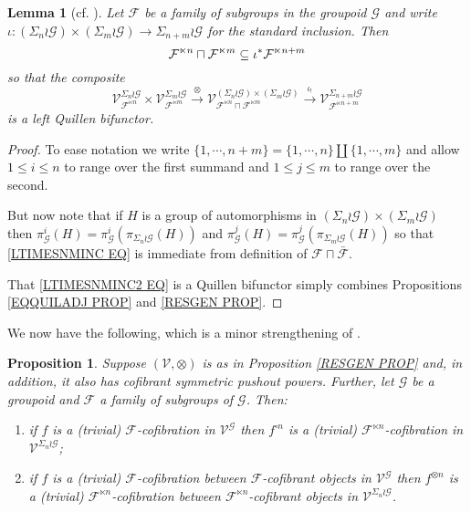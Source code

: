 \documentclass[a4paper,10pt
,draft
]{article}%
\numberwithin{equation}{section}
\numberwithin{figure}{section}
\newtheorem{lemma}[equation]{Lemma}%
\newtheorem{proposition}[equation]{Proposition}%
\theoremstyle{definition} %
\newcommand{\F}{\ensuremath{\mathcal F}}
\newcommand{\V}{\ensuremath{\mathcal V}}
\newcommand{\G}{\ensuremath{\mathcal G}}
\newcommand{\1}{\ensuremath{\mathbbm 1}}%
\begin{document}
\begin{lemma}[cf. {\cite[Prop. 6.22]{BP_geo}}]
\label{LTIMESNMINC LEM}
Let $\F$ be a family of subgroups in the groupoid $\G$ and write
$\iota \colon \left(\Sigma_n \wr \G\right) \times \left(\Sigma_m \wr \G\right) \to \Sigma_{n+m} \wr \G$ for the standard inclusion.
Then 
\begin{equation}\label{LTIMESNMINC EQ}
\F^{\ltimes n} \sqcap \F^{\ltimes m} \subseteq 
\iota^{\**}
\F^{\ltimes n+m}
\end{equation}
so that the composite
\begin{equation}\label{LTIMESNMINC2 EQ}
	\V^{\Sigma_n \wr \G}_{\F^{\ltimes n}} \times \V^{\Sigma_m \wr \G}_{\F^{\ltimes m}}
\xrightarrow{\otimes}
	\V^{\left(\Sigma_n \wr \G\right) \times \left(\Sigma_m \wr \G\right)}_{\F^{\ltimes n} \sqcap \F^{\ltimes m}}
\xrightarrow{\iota_!}
	\V^{\Sigma_{n+m} \wr \G}_{\F^{\ltimes n+m}}
\end{equation}
is a left Quillen bifunctor.
\end{lemma}



\begin{proof}
To ease notation we write
$\{1,\cdots, n+m\} = \{1,\cdots,n\} \amalg \{1,\cdots,m\}$
and allow $1\leq i\leq n$ to range over the first summand and $1 \leq j \leq m$ to range over the second.

But now note that if $H$ is a group of automorphisms in 
$(\Sigma_n \wr \G) \times (\Sigma_m \wr \G)$
then 
$\pi^i_{\G}(H) = \pi^i_{\G}(\pi_{\Sigma_n \wr \G}(H))$
and
$\pi^j_{\G}(H) = \pi^j_{\G}(\pi_{\Sigma_m \wr \G}(H))$
so that 
\eqref{LTIMESNMINC EQ} is immediate from definition of 
$\F \sqcap \bar{\F}$.

That \eqref{LTIMESNMINC2 EQ} is a Quillen bifunctor simply combines 
Propositions \ref{EQQUILADJ PROP} and \ref{RESGEN PROP}.
\end{proof}





We now have the following, which is a minor strengthening of 
\cite[Prop. 6.24]{BP_geo}.




\begin{proposition}\label{SIGMAWRGF PROP}
Suppose $(\V, \otimes)$ is as in Proposition \ref{RESGEN PROP} and, in addition, it also has cofibrant symmetric pushout powers.
Further, let $\G$ be a groupoid and
$\F$ a family of subgroups of $\G$.
Then:
\begin{enumerate}[label=(\roman*)]
\item if $f$ is a (trivial) $\F$-cofibration in $\V^{\G}$
then $f^{\square n}$ is a (trivial)
$\F^{\ltimes n}$-cofibration in $\V^{\Sigma_n \wr \G}$;
\item if $f$ is a (trivial) $\F$-cofibration between $\F$-cofibrant objects in $\V^{\G}$
then $f^{\otimes n}$ is a (trivial)
$\F^{\ltimes n}$-cofibration
between $\F^{\ltimes n}$-cofibrant objects in $\V^{\Sigma_n \wr \G}$.
\end{enumerate}
\end{proposition}
\end{document}
